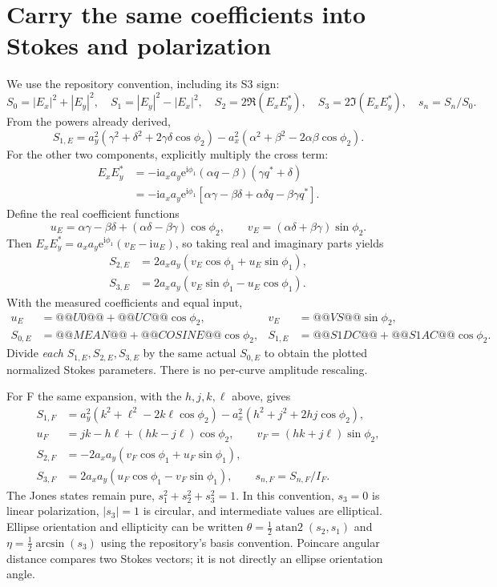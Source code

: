\documentclass[11pt,a4paper]{article}
\newcommand{\ee}{\mathrm e}
\newcommand{\ii}{\mathrm i}
\begin{document}
\section{Carry the same coefficients into Stokes and polarization}
We use the repository convention, including its S3 sign:
\[
S_0=|E_x|^2+|E_y|^2,\quad S_1=|E_y|^2-|E_x|^2,\quad
S_2=2\Re(E_xE_y^*),\quad S_3=2\Im(E_xE_y^*),\quad s_n=S_n/S_0.
\]
From the powers already derived,
\begin{equation}
S_{1,E}=a_y^2(\gamma^2+\delta^2+2\gamma\delta\cos\phi_2)
-a_x^2(\alpha^2+\beta^2-2\alpha\beta\cos\phi_2).
\end{equation}
For the other two components, explicitly multiply the cross term:
\begin{align}
E_xE_y^*&=-\ii a_xa_y\ee^{\ii\phi_1}
(\alpha q-\beta)(\gamma q^*+\delta)\\
&=-\ii a_xa_y\ee^{\ii\phi_1}
[\alpha\gamma-\beta\delta+\alpha\delta q-\beta\gamma q^*].
\end{align}
Define the real coefficient functions
\[
u_E=\alpha\gamma-\beta\delta+(\alpha\delta-\beta\gamma)\cos\phi_2,
\qquad v_E=(\alpha\delta+\beta\gamma)\sin\phi_2.
\]
Then $E_xE_y^*=a_xa_y\ee^{\ii\phi_1}(v_E-\ii u_E)$, so taking real and
imaginary parts yields
\begin{align}
S_{2,E}&=2a_xa_y(v_E\cos\phi_1+u_E\sin\phi_1),\\
S_{3,E}&=2a_xa_y(v_E\sin\phi_1-u_E\cos\phi_1).
\end{align}
With the measured coefficients and equal input,
\begin{align*}
u_E&=@@U0@@+@@UC@@\cos\phi_2, &v_E&=@@VS@@\sin\phi_2,\\
S_{0,E}&=@@MEAN@@+@@COSINE@@\cos\phi_2, &
S_{1,E}&=@@S1DC@@+@@S1AC@@\cos\phi_2.
\end{align*}
Divide \emph{each} $S_{1,E},S_{2,E},S_{3,E}$ by the same actual $S_{0,E}$ to
obtain the plotted normalized Stokes parameters. There is no per-curve
amplitude rescaling.

For F the same expansion, with the $h,j,k,\ell$ above, gives
\begin{align*}
S_{1,F}&=a_y^2(k^2+\ell^2-2k\ell\cos\phi_2)
-a_x^2(h^2+j^2+2hj\cos\phi_2),\\
u_F&=jk-h\ell+(hk-j\ell)\cos\phi_2,\qquad
v_F=(hk+j\ell)\sin\phi_2,\\
S_{2,F}&=-2a_xa_y(v_F\cos\phi_1+u_F\sin\phi_1),\\
S_{3,F}&=2a_xa_y(u_F\cos\phi_1-v_F\sin\phi_1),\qquad
s_{n,F}=S_{n,F}/I_F.
\end{align*}
The Jones states remain pure, $s_1^2+s_2^2+s_3^2=1$. In this convention,
$s_3=0$ is linear polarization, $|s_3|=1$ is circular, and intermediate values
are elliptical. Ellipse orientation and ellipticity can be written
$\theta=\tfrac12\operatorname{atan2}(s_2,s_1)$ and
$\eta=\tfrac12\arcsin(s_3)$ using the repository's basis convention. Poincare
angular distance compares two Stokes vectors; it is not directly an ellipse
orientation angle.
\end{document}
